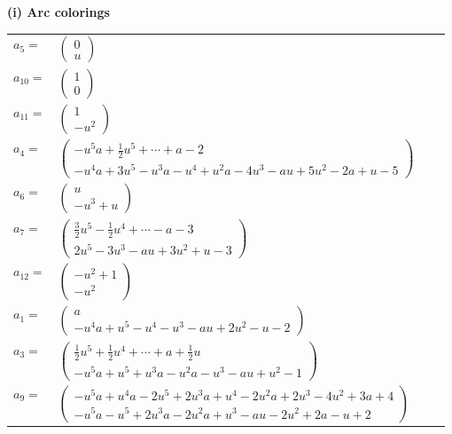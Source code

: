 \documentclass[1p]{elsarticle_modified}
\theoremstyle{definition}
\begin{document}
\flushleft \textbf{(i) Arc colorings}\\
\begin{tabular}{m{7pt} m{180pt} m{7pt} m{180pt} }
\flushright $a_{5}=$&$\begin{pmatrix}0\\u\end{pmatrix}$ \\
\flushright $a_{10}=$&$\begin{pmatrix}1\\0\end{pmatrix}$ \\
\flushright $a_{11}=$&$\begin{pmatrix}1\\- u^2\end{pmatrix}$ \\
\flushright $a_{4}=$&$\begin{pmatrix}- u^5 a+\frac{1}{2} u^5+\cdots+a-2\\- u^4 a+3 u^5- u^3 a- u^4+u^2 a-4 u^3- a u+5 u^2-2 a+u-5\end{pmatrix}$ \\
\flushright $a_{6}=$&$\begin{pmatrix}u\\- u^3+u\end{pmatrix}$ \\
\flushright $a_{7}=$&$\begin{pmatrix}\frac{3}{2} u^5-\frac{1}{2} u^4+\cdots- a-3\\2 u^5-3 u^3- a u+3 u^2+u-3\end{pmatrix}$ \\
\flushright $a_{12}=$&$\begin{pmatrix}- u^2+1\\- u^2\end{pmatrix}$ \\
\flushright $a_{1}=$&$\begin{pmatrix}a\\- u^4 a+u^5- u^4- u^3- a u+2 u^2- u-2\end{pmatrix}$ \\
\flushright $a_{3}=$&$\begin{pmatrix}\frac{1}{2} u^5+\frac{1}{2} u^4+\cdots+a+\frac{1}{2} u\\- u^5 a+u^5+u^3 a- u^2 a- u^3- a u+u^2-1\end{pmatrix}$ \\
\flushright $a_{9}=$&$\begin{pmatrix}- u^5 a+u^4 a-2 u^5+2 u^3 a+u^4-2 u^2 a+2 u^3-4 u^2+3 a+4\\- u^5 a- u^5+2 u^3 a-2 u^2 a+u^3- a u-2 u^2+2 a- u+2\end{pmatrix}$ \\

\end{tabular}
\end{document}
